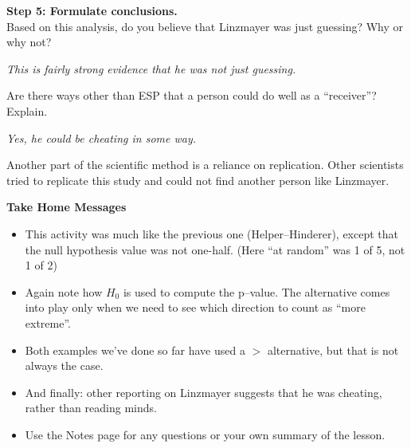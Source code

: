 

{\bf Step 5: Formulate conclusions.}\\
 Based on this analysis, do you believe  that Linzmayer was just
 guessing? Why or why not? 

\begin{students}
  \vspace{1.5cm}
\end{students}
\begin{key}
{\it This is fairly strong evidence that he was not just guessing.}
\end{key}

Are there ways other than ESP that a person could do well as a ``receiver''?
Explain. 

\begin{students}
  \vspace{1cm}
\end{students}
\begin{key}
{\it Yes, he could be cheating in some way.}
\end{key}


Another part of the scientific method is a reliance on replication.
Other scientists tried to replicate this study and could not find
another person like Linzmayer. 



{\bf Take Home Messages}\vspace{-.5cm}
\begin{itemize}
\item 
This activity was much like the previous one (Helper--Hinderer),
except that the null hypothesis value was not one-half. (Here ``at
random'' was 1 of 5, not 1 of 2)
\item 
Again note how $H_0$ is used to compute the p--value.  The alternative
comes into play only when we need to see which direction to count as
``more extreme''.
\item 
Both examples we've done so far have used a $>$ alternative, but that
is not always the case.
\item 
And finally: other reporting on Linzmayer suggests that he was
cheating, rather than reading minds.
 \item 
  Use the Notes page for any questions or your own summary of the
  lesson. \\
  
\end{itemize}

